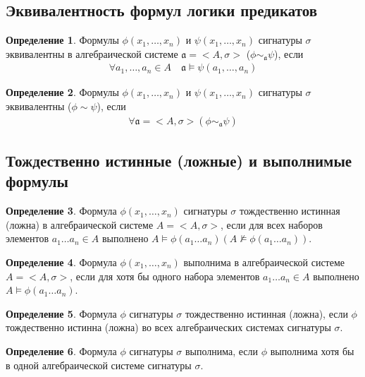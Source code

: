 \documentclass[a4paper]{article}
\theoremstyle{definition}
\newtheorem*{definition}{Определение}
\theoremstyle{remark}
\begin{document}
    \subsection{Эквивалентность формул логики предикатов}
    \begin{definition}
        Формулы $\phi(x_1, \dots, x_n)$ и $\psi(x_1, \dots, x_n)$ сигнатуры $\sigma$ эквивалентны
        в алгебраической системе $\mathfrak{a} = <A, \sigma>$ ($\phi \sim_\mathfrak{a} \psi$), если
        \begin{align*}
            \forall a_1, \dots, a_n\in A\quad\mathfrak{a}\models \psi(a_1, \dots, a_n)
        \end{align*}
    \end{definition}
    \begin{definition}
        Формулы $\phi(x_1, \dots, x_n)$ и $\psi(x_1, \dots, x_n)$ сигнатуры $\sigma$ эквивалентны
        ($\phi \sim  \psi$), если
        \begin{align*}
            \forall \mathfrak{a} = <A, \sigma> (\phi \sim_\mathfrak{a} \psi)
        \end{align*}
    \end{definition}
    \subsection{Тождественно истинные (ложные) и выполнимые формулы}
    \begin{definition}
        Формула $\phi(x_1, \dots, x_n)$ сигнатуры $\sigma$ тождественно истинная (ложна) в алгебраической 
        системе $A = <A, \sigma>$, если для всех наборов элементов $a_1\dots a_n \in A$ выполнено 
        $A \models \phi(a_1\dots a_n) (A \not\models \phi(a_1\dots a_n)).$
    \end{definition}
    \begin{definition}
        Формула $\phi(x_1, \dots, x_n)$ выполнима в алгебраической системе 
        $A = <A, \sigma>$, если для хотя бы одного набора элементов $a_1\dots a_n \in A $ выполнено 
        $A \models \phi(a_1\dots a_n)$.
    \end{definition}
    \begin{definition}
        Формула $\phi$ сигнатуры $\sigma $ тождественно истинная (ложна), если $\phi$ тождественно истинна 
        (ложна) во всех алгебраических системах сигнатуры $\sigma$. 
    \end{definition}
    \begin{definition}
        Формула $\phi$ сигнатуры $\sigma$ выполнима, 
        если $\phi$ выполнима хотя бы в одной алгебраической системе сигнатуры $\sigma$. 
    \end{definition}
\end{document}
